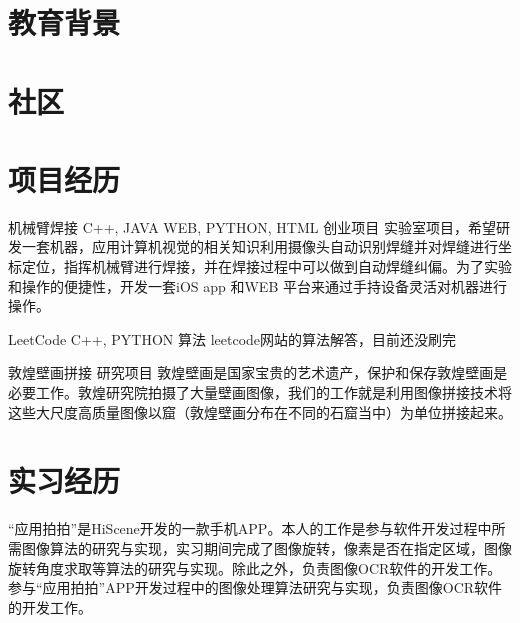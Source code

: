 \documentclass[11pt,a4paper]{moderncv}
\title{}               %
\begin{document}
\maketitle

\section{教育背景}
 {}{} %


\section{社区}

\section{项目经历}
\renewcommand{\baselinestretch}{1.1}

{机械臂焊接}
{C++, JAVA WEB, PYTHON, HTML}
{创业项目}{}
{实验室项目，希望研发一套机器，应用计算机视觉的相关知识利用摄像头自动识别焊缝并对焊缝进行坐标定位，指挥机械臂进行焊接，并在焊接过程中可以做到自动焊缝纠偏。为了实验和操作的便捷性，开发一套iOS app 和WEB 平台来通过手持设备灵活对机器进行操作。}

\vspace*{0.2\baselineskip}
{LeetCode}
{C++, PYTHON}
{算法}{}
{leetcode网站的算法解答，目前还没刷完}

\vspace*{0.2\baselineskip}
{敦煌壁画拼接}{}
{研究项目}{}
{敦煌壁画是国家宝贵的艺术遗产，保护和保存敦煌壁画是必要工作。敦煌研究院拍摄了大量壁画图像，我们的工作就是利用图像拼接技术将这些大尺度高质量图像以窟（敦煌壁画分布在不同的石窟当中）为单位拼接起来。}

\section{实习经历}
{}{“应用拍拍”是HiScene开发的一款手机APP。本人的工作是参与软件开发过程中所需图像算法的研究与实现，实习期间完成了图像旋转，像素是否在指定区域，图像旋转角度求取等算法的研究与实现。除此之外，负责图像OCR软件的开发工作。}{参与“应用拍拍”APP开发过程中的图像处理算法研究与实现，负责图像OCR软件的开发工作。}
\end{document}
